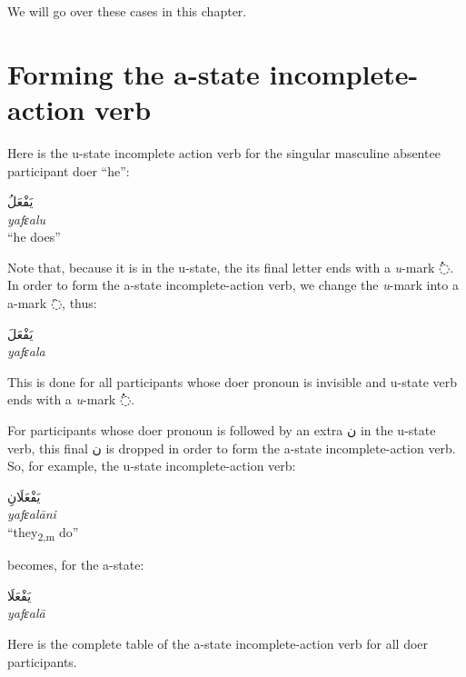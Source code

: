 \documentclass[
  10pt,
]{book}
\begin{document}
We will go over these cases in this chapter.

\section{Forming the a-state incomplete-action verb}\label{forming-the-a-state-incomplete-action-verb}

Here is the u-state incomplete action verb for the singular masculine absentee participant doer \enquote{he}:

\foreignlanguage{arabic}{يَفْعَلُ}\\
\emph{yafɛalu}\\
\enquote{he does}

Note that, because it is in the u-state, the its final letter ends with a \emph{u}-mark \foreignlanguage{arabic}{◌ُ}.
In order to form the
a-state
incomplete-action verb,
we change the \emph{u}-mark into a
a-mark \foreignlanguage{arabic}{◌َ}, thus:

\foreignlanguage{arabic}{يَفْعَلَ}\\
\emph{yafɛala}

This is done for all participants whose doer pronoun is invisible and u-state verb ends with a \emph{u}-mark \foreignlanguage{arabic}{◌ُ}.

For participants whose doer pronoun is followed by an extra \foreignlanguage{arabic}{ن} in the u-state verb, this final \foreignlanguage{arabic}{ن} is dropped in order to form the
a-state
incomplete-action verb.
So, for example, the u-state
incomplete-action verb:

\foreignlanguage{arabic}{يَفْعَلَانِ}\\
\emph{yafɛalāni}\\
\enquote{they\textsubscript{2,m} do}

becomes, for the
a-state:

\foreignlanguage{arabic}{يَفْعَلَا}\\
\emph{yafɛalā}

Here is the complete table of the
a-state
incomplete-action verb
for all doer participants.
\end{document}
